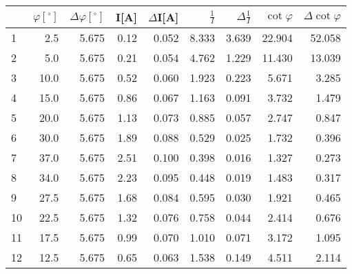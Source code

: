 \begin{tabular}{lrrrrrrrr}
\toprule
{} &  $\varphi[^\circ]$ &  $\Delta \varphi[^\circ]$ &  I[A] &  $\Delta$I[A] &  $\frac{1}{I}$ &  $\Delta \frac{1}{I}$ &  $\cot{\varphi}$ &  $\Delta \cot{\varphi}$ \\
\midrule
1  &                2.5 &                     5.675 &  0.12 &         0.052 &          8.333 &                 3.639 &           22.904 &                  52.058 \\
2  &                5.0 &                     5.675 &  0.21 &         0.054 &          4.762 &                 1.229 &           11.430 &                  13.039 \\
3  &               10.0 &                     5.675 &  0.52 &         0.060 &          1.923 &                 0.223 &            5.671 &                   3.285 \\
4  &               15.0 &                     5.675 &  0.86 &         0.067 &          1.163 &                 0.091 &            3.732 &                   1.479 \\
5  &               20.0 &                     5.675 &  1.13 &         0.073 &          0.885 &                 0.057 &            2.747 &                   0.847 \\
6  &               30.0 &                     5.675 &  1.89 &         0.088 &          0.529 &                 0.025 &            1.732 &                   0.396 \\
7  &               37.0 &                     5.675 &  2.51 &         0.100 &          0.398 &                 0.016 &            1.327 &                   0.273 \\
8  &               34.0 &                     5.675 &  2.23 &         0.095 &          0.448 &                 0.019 &            1.483 &                   0.317 \\
9  &               27.5 &                     5.675 &  1.68 &         0.084 &          0.595 &                 0.030 &            1.921 &                   0.465 \\
10  &               22.5 &                     5.675 &  1.32 &         0.076 &          0.758 &                 0.044 &            2.414 &                   0.676 \\
11 &               17.5 &                     5.675 &  0.99 &         0.070 &          1.010 &                 0.071 &            3.172 &                   1.095 \\
12 &               12.5 &                     5.675 &  0.65 &         0.063 &          1.538 &                 0.149 &            4.511 &                   2.114 \\
\bottomrule
\end{tabular}
